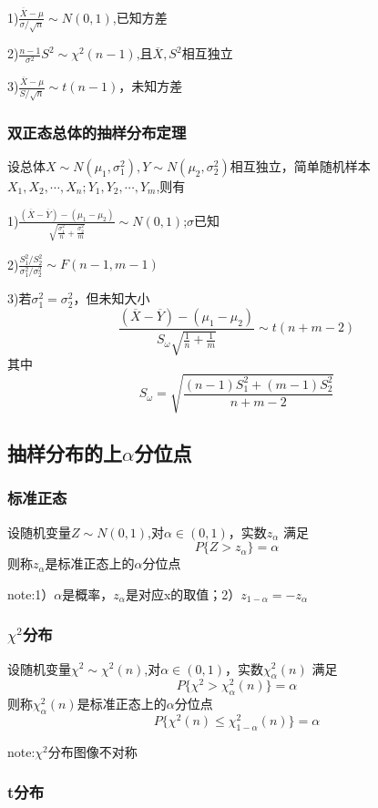 \documentclass[11pt,twoside,a4paper]{ctexart}
\begin{document}
1)$\frac{\overline{X} - \mu }{\sigma / \sqrt {n}} \sim N(0,1)$,已知方差

2)$\frac{n-1}{\sigma ^2}S^2 \sim \chi ^2(n-1)$,且$\overline{X},S^2$相互独立

3)$\frac{\overline{X} - \mu }{S/\sqrt{n}} \sim t(n-1)$，未知方差

\subsubsection{双正态总体的抽样分布定理}
设总体$X\sim N(\mu _1,\sigma_1 ^2),Y\sim N(\mu _2,\sigma _2 ^2)$相互独立，简单随机样本$X_1,X_2,\cdots ,X_n;Y_1,Y_2,\cdots ,Y_m$,则有

1)$\frac{(\overline{X} - \overline{Y}) - (\mu _1 - \mu _2)}{\sqrt{\frac{\sigma _1^2}{n} + \frac{\sigma _2^2}{m}}} \sim N(0,1)$;$\sigma $已知

2)$\frac{S^2_1/S^2_2}{\sigma _1^2/\sigma _2^2} \sim F(n - 1,m - 1)$

3)若$\sigma _1^2 = \sigma _2^2$，但未知大小
\[\frac{(\overline{X} - \overline{Y}) - (\mu _1 - \mu _2)}{S_\omega \sqrt{\frac{1}{n} + \frac{1}{m}}} \sim t(n + m - 2)\]
其中
\[S_\omega = \sqrt{\frac{(n - 1)S_1^2 + (m - 1)S_2^2}{n + m - 2}}\]

\subsection{抽样分布的上$\alpha $分位点}

\subsubsection{标准正态}

设随机变量$Z\sim N(0,1)$,对$\alpha \in (0,1)$，实数$z_\alpha$ 满足
\[P\{Z > z_\alpha\} = \alpha\]
则称$z_\alpha $是标准正态上的$\alpha$分位点

note:1）$\alpha$是概率，$z_\alpha$是对应x的取值；2）$z_{1 - \alpha} = - z_\alpha$

\subsubsection{$\chi ^2$分布}
设随机变量$\chi ^2\sim \chi^2(n)$,对$\alpha \in (0,1)$，实数$\chi ^2_\alpha(n)$ 满足
\[P\{\chi ^2 > \chi ^2_\alpha(n)\} = \alpha\]
则称$\chi ^2_\alpha(n) $是标准正态上的$\alpha$分位点
\[P\{\chi ^2(n) \leq \chi ^2_{1 - \alpha}(n)\} = \alpha\]

note:$\chi^2$分布图像不对称

\subsubsection{t分布}
\end{document}
